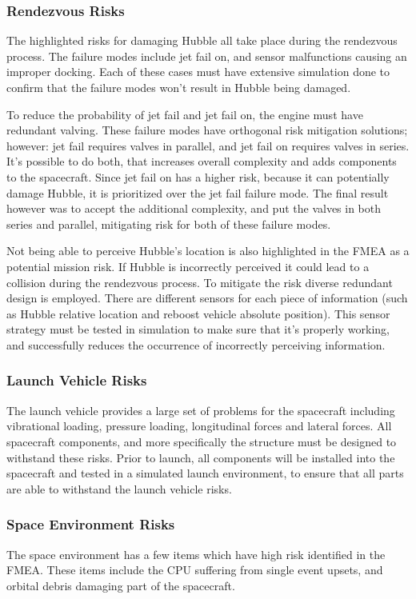 \documentclass[paper=letter, fontsize=11pt]{scrartcl} %
\numberwithin{equation}{section} %
\numberwithin{figure}{section} %
\numberwithin{table}{section} %
\begin{document}
\subsubsection{Rendezvous Risks}
The highlighted risks for damaging Hubble all take place during the rendezvous process. The failure modes include jet fail on, and sensor malfunctions causing an improper docking. Each of these cases must have extensive simulation done to confirm that the failure modes won't result in Hubble being damaged.

To reduce the probability of jet fail and jet fail on, the engine must have redundant valving. These failure modes have orthogonal risk mitigation solutions; however: jet fail requires valves in parallel, and jet fail on requires valves in series. It's possible to do both, that increases overall complexity and adds components to the spacecraft. Since jet fail on has a higher risk, because it can potentially damage Hubble, it is prioritized over the jet fail failure mode. The final result however was to accept the additional complexity, and put the valves in both series and parallel, mitigating risk for both of these failure modes.

Not being able to perceive Hubble's location is also highlighted in the FMEA as a potential mission risk. If Hubble is incorrectly perceived it could lead to a collision during the rendezvous process. To mitigate the risk diverse redundant design is employed. There are different sensors for each piece of information (such as Hubble relative location and reboost vehicle absolute position). This sensor strategy must be tested in simulation to make sure that it's properly working, and successfully reduces the occurrence of incorrectly perceiving information.

\subsubsection{Launch Vehicle Risks}
The launch vehicle provides a large set of problems for the spacecraft including vibrational loading, pressure loading, longitudinal forces and lateral forces. All spacecraft components, and more specifically the structure must be designed to withstand these risks. Prior to launch, all components will be installed into the spacecraft and tested in a simulated launch environment, to ensure that all parts are able to withstand the launch vehicle risks.

\subsubsection{Space Environment Risks}
The space environment has a few items which have high risk identified in the FMEA. These items include the CPU suffering from single event upsets, and orbital debris damaging part of the spacecraft.
\end{document}
